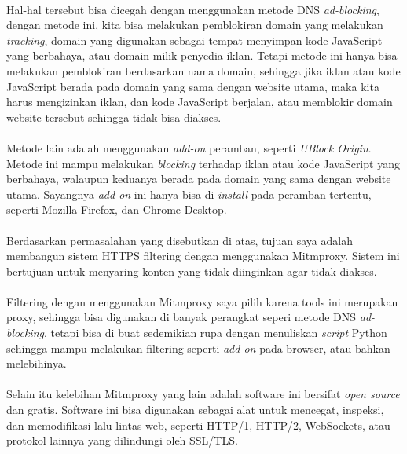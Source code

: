 \documentclass[./bab_1.tex]{subfiles}
\begin{document}
  \paragraph*{}Hal-hal tersebut bisa dicegah dengan
  menggunakan metode DNS \textit{ad-blocking}, dengan metode
  ini, kita bisa melakukan pemblokiran domain yang melakukan
  \textit{tracking}, domain yang digunakan sebagai
  tempat menyimpan kode JavaScript yang berbahaya, atau
  domain milik penyedia iklan. Tetapi metode
  ini hanya bisa melakukan pemblokiran berdasarkan nama
  domain, sehingga jika iklan atau kode JavaScript berada
  pada domain yang sama dengan website utama, maka kita
  harus mengizinkan iklan, dan kode JavaScript berjalan,
  atau memblokir domain website tersebut sehingga tidak bisa
  diakses.

  \paragraph*{}Metode lain adalah menggunakan
  \textit{add-on} peramban, seperti \textit{UBlock Origin}.
  Metode ini mampu melakukan \textit{blocking} terhadap
  iklan atau kode JavaScript yang berbahaya, walaupun
  keduanya berada pada domain yang sama dengan website
  utama. Sayangnya \textit{add-on} ini hanya bisa
  di-\textit{install} pada peramban tertentu, seperti
  Mozilla Firefox, dan Chrome Desktop.

  \paragraph*{}Berdasarkan permasalahan yang disebutkan
  di atas, tujuan saya adalah membangun sistem HTTPS
  filtering dengan menggunakan Mitmproxy. Sistem ini
  bertujuan untuk menyaring konten yang tidak diinginkan
  agar tidak diakses.

  \paragraph*{}Filtering dengan menggunakan Mitmproxy saya
  pilih karena tools ini merupakan proxy, sehingga bisa
  digunakan di banyak perangkat seperi metode DNS
  \textit{ad-blocking}, tetapi bisa di buat sedemikian rupa
  dengan menuliskan \textit{script} Python sehingga mampu
  melakukan filtering seperti \textit{add-on} pada browser,
  atau bahkan melebihinya.

  \paragraph*{}Selain itu kelebihan Mitmproxy yang lain
  adalah software ini bersifat \textit{open source} dan
  gratis. Software ini bisa digunakan sebagai alat untuk
  mencegat, inspeksi, dan memodifikasi lalu lintas web,
  seperti HTTP/1, HTTP/2, WebSockets, atau protokol lainnya
  yang dilindungi oleh SSL/TLS.
\end{document}
